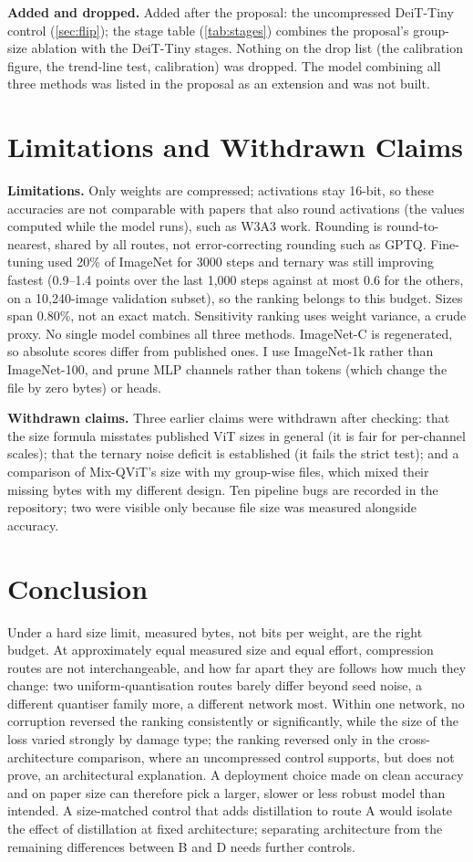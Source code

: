 \documentclass[10pt,twocolumn,letterpaper]{article}
\begin{document}
\textbf{Added and dropped.} Added after the proposal: the uncompressed DeiT-Tiny control (\cref{sec:flip}); the stage table (\cref{tab:stages}) combines the proposal's group-size ablation with the DeiT-Tiny stages. Nothing on the drop list (the calibration figure, the trend-line test, calibration) was dropped. The model combining all three methods was listed in the proposal as an extension and was not built.

\section{Limitations and Withdrawn Claims}
\label{sec:limits}
\textbf{Limitations.} Only weights are compressed; activations stay 16-bit, so these accuracies are not comparable with papers that also round activations (the values computed while the model runs), such as W3A3 work. Rounding is round-to-nearest, shared by all routes, not error-correcting rounding such as GPTQ. Fine-tuning used 20\% of ImageNet for 3000 steps and ternary was still improving fastest (0.9--1.4 points over the last 1,000 steps against at most 0.6 for the others, on a 10,240-image validation subset), so the ranking belongs to this budget. Sizes span 0.80\%, not an exact match. Sensitivity ranking uses weight variance, a crude proxy. No single model combines all three methods. ImageNet-C is regenerated, so absolute scores differ from published ones. I use ImageNet-1k rather than ImageNet-100, and prune MLP channels rather than tokens (which change the file by zero bytes) or heads.

\textbf{Withdrawn claims.} Three earlier claims were withdrawn after checking: that the size formula misstates published ViT sizes in general (it is fair for per-channel scales); that the ternary noise deficit is established (it fails the strict test); and a comparison of Mix-QViT's size with my group-wise files, which mixed their missing bytes with my different design. Ten pipeline bugs are recorded in the repository; two were visible only because file size was measured alongside accuracy.

\section{Conclusion}
Under a hard size limit, measured bytes, not bits per weight, are the right budget. At approximately equal measured size and equal effort, compression routes are not interchangeable, and how far apart they are follows how much they change: two uniform-quantisation routes barely differ beyond seed noise, a different quantiser family more, a different network most. Within one network, no corruption reversed the ranking consistently or significantly, while the size of the loss varied strongly by damage type; the ranking reversed only in the cross-architecture comparison, where an uncompressed control supports, but does not prove, an architectural explanation. A deployment choice made on clean accuracy and on paper size can therefore pick a larger, slower or less robust model than intended. A size-matched control that adds distillation to route A would isolate the effect of distillation at fixed architecture; separating architecture from the remaining differences between B and D needs further controls.
\end{document}

